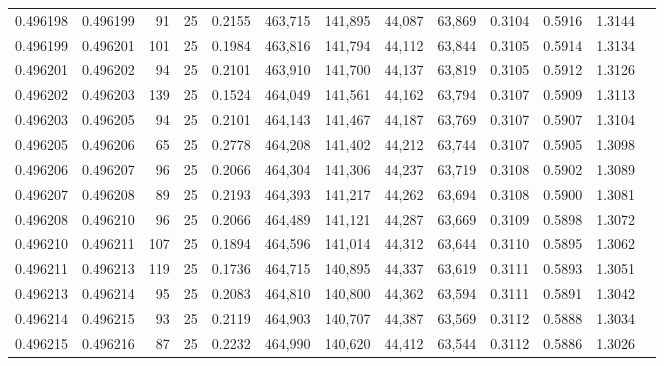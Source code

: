 \begin{tabular}{rrrrrrrrrrrrr}
0.496198 & 0.496199 &    91 &  25 &                                     0.2155 & 463,715 & 141,895 &  44,087 &  63,869 & 0.3104 & 0.5916 & 1.3144 \\
0.496199 & 0.496201 &   101 &  25 &                                     0.1984 & 463,816 & 141,794 &  44,112 &  63,844 & 0.3105 & 0.5914 & 1.3134 \\
0.496201 & 0.496202 &    94 &  25 &                                     0.2101 & 463,910 & 141,700 &  44,137 &  63,819 & 0.3105 & 0.5912 & 1.3126 \\
0.496202 & 0.496203 &   139 &  25 &                                     0.1524 & 464,049 & 141,561 &  44,162 &  63,794 & 0.3107 & 0.5909 & 1.3113 \\
0.496203 & 0.496205 &    94 &  25 &                                     0.2101 & 464,143 & 141,467 &  44,187 &  63,769 & 0.3107 & 0.5907 & 1.3104 \\
0.496205 & 0.496206 &    65 &  25 &                                     0.2778 & 464,208 & 141,402 &  44,212 &  63,744 & 0.3107 & 0.5905 & 1.3098 \\
0.496206 & 0.496207 &    96 &  25 &                                     0.2066 & 464,304 & 141,306 &  44,237 &  63,719 & 0.3108 & 0.5902 & 1.3089 \\
0.496207 & 0.496208 &    89 &  25 &                                     0.2193 & 464,393 & 141,217 &  44,262 &  63,694 & 0.3108 & 0.5900 & 1.3081 \\
0.496208 & 0.496210 &    96 &  25 &                                     0.2066 & 464,489 & 141,121 &  44,287 &  63,669 & 0.3109 & 0.5898 & 1.3072 \\
0.496210 & 0.496211 &   107 &  25 &                                     0.1894 & 464,596 & 141,014 &  44,312 &  63,644 & 0.3110 & 0.5895 & 1.3062 \\
0.496211 & 0.496213 &   119 &  25 &                                     0.1736 & 464,715 & 140,895 &  44,337 &  63,619 & 0.3111 & 0.5893 & 1.3051 \\
0.496213 & 0.496214 &    95 &  25 &                                     0.2083 & 464,810 & 140,800 &  44,362 &  63,594 & 0.3111 & 0.5891 & 1.3042 \\
0.496214 & 0.496215 &    93 &  25 &                                     0.2119 & 464,903 & 140,707 &  44,387 &  63,569 & 0.3112 & 0.5888 & 1.3034 \\
0.496215 & 0.496216 &    87 &  25 &                                     0.2232 & 464,990 & 140,620 &  44,412 &  63,544 & 0.3112 & 0.5886 & 1.3026 \\

\end{tabular}
